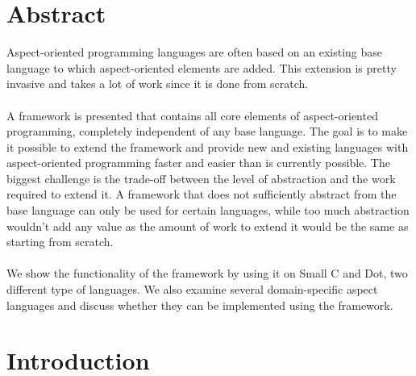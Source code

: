\documentclass[a4paper]{report}
\begin{document}
\clearpage 
{} 
{}
\chapter*{Abstract}
Aspect-oriented programming languages are often based on an existing base language to which aspect-oriented elements are added. This extension is pretty invasive and takes a lot of work since it is done from scratch.\\
\\
A framework is presented that contains all core elements of aspect-oriented programming, completely independent of any base language. The goal is to make it possible to extend the framework and provide new and existing languages with aspect-oriented programming faster and easier than is currently possible. The biggest challenge is the trade-off between the level of abstraction and the work required to extend it. A framework that does not sufficiently abstract from the base language can only be used for certain languages, while too much abstraction wouldn't add any value as the amount of work to extend it would be the same as starting from scratch.\\
\\
We show the functionality of the framework by using it on Small C and Dot, two different type of languages. We also examine several domain-specific aspect languages and discuss whether they can be implemented using the framework.

\mainbodypages

\chapter{Introduction}
\end{document}

